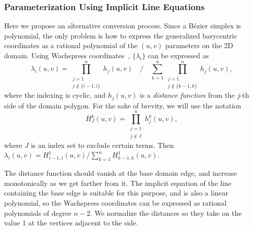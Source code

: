 \documentclass[9pt,academicons]{article}
\begin{document}
\subsubsection{Parameterization Using Implicit Line Equations}
\label{subsubsec:parameters}
Here we propose an alternative conversion process. Since a B\'ezier simplex is polynomial,
the only problem is how to express the generalized barycentric coordinates as a rational polynomial
of the $(u,v)$ parameters on the 2D domain. Using Wachspress coordinates~\cite{Floater:2015},
$\{\lambda_i\}$ can be expressed as
\begin{equation}
  \label{eq:wachspress}
  \lambda_i(u,v) = \prod_{\substack{j=1\\j\notin\{i-1,i\}}}^nh_j(u,v) \quad\bigg/\quad
                   \sum_{k=1}^n\prod_{\substack{j=1\\j\notin\{k-1,k\}}}^nh_j(u,v),
\end{equation}
where the indexing is cyclic, and $h_j(u,v)$ is a \emph{distance function}
from the $j$-th side of the domain polygon. For the sake of brevity,
we will use the notation
\begin{equation}
  \label{eq:prod-h}
  H_J^k(u,v)=\prod_{\substack{j=1\\j\notin{J}}}^nh_j^k(u,v),
\end{equation}
where $J$ is an index set to exclude certain terms.
Then $\lambda_i(u,v)=H_{i-1,i}^1(u,v)/\sum_{k=1}^nH_{k-1,k}^1(u,v)$.

The distance function should vanish at the base domain edge, and increase monotonically
as we get farther from it.
The implicit
equation of the line containing the base edge is suitable for this purpose,
and is also a linear polynomial,
so the Wachspress coordinates can be expressed as rational polynomials of degree $n-2$. We
normalize the distances so they take on the value 1 at the vertices adjacent to the side.
\end{document}
